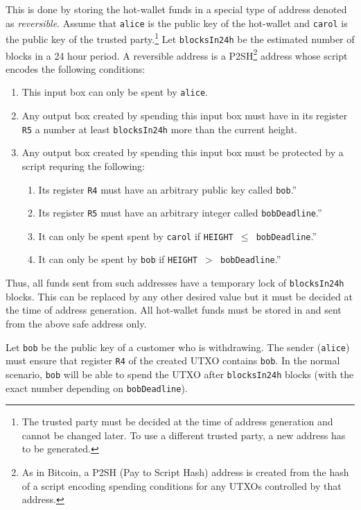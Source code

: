 \documentclass[11pt]{article}
\begin{document}
This is done by storing the hot-wallet funds in a special type of address denoted as {\em reversible}. Assume that \texttt{alice} is the public key of the hot-wallet and \texttt{carol} is the public key of the trusted party.\footnote{The trusted party must be decided at the time of address generation and cannot be changed later. To use a different trusted party, a new address has to be generated.} Let \texttt{blocksIn24h} be the estimated number of blocks in a 24 hour period. A reversible address is a P2SH\footnote{As in Bitcoin, a P2SH (Pay to Script Hash) address is created from the hash of a script encoding spending conditions for any UTXOs controlled by that address.} address whose script encodes the following conditions:   
\begin{enumerate}
	\item This input box can only be spent by \texttt{alice}.
	\item Any output box created by spending this input box must have in its register \texttt{R5} a number at least \texttt{blocksIn24h} more than the current height. 
	\item Any output box created by spending this input box must be protected by a script requring the following: 	
	\begin{enumerate}
		\item Its register \texttt{R4} must have an arbitrary public key called \texttt{bob}.'' 
		\item Its register \texttt{R5} must have an arbitrary integer called \texttt{bobDeadline}.'' 
		\item It can only be spent spent by \texttt{carol} if \texttt{HEIGHT $\leq$ bobDeadline}.''
		\item It can only be spent by \texttt{bob} if \texttt{HEIGHT $>$ bobDeadline}.''	
	\end{enumerate}  
\end{enumerate}

Thus, all funds sent from such addresses have a temporary lock of \texttt{blocksIn24h} blocks. This can be replaced by any other desired value but it must be decided at the time of address generation. All hot-wallet funds must be stored in and sent from the above safe address only. 

Let \texttt{bob} be the public key of a customer who is withdrawing. The sender (\texttt{alice}) must ensure that register \texttt{R4} of the created UTXO contains \texttt{bob}. In the normal scenario, \texttt{bob} will be able to spend the UTXO after \texttt{blocksIn24h} blocks (with the exact number depending on \texttt{bobDeadline}). 
\end{document}
